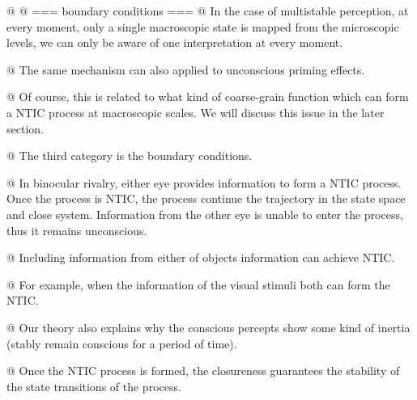 \documentclass[utf8]{article}
\begin{document}
		
		\begin{WritingMaterials}
        	@ 
        	@  === boundary conditions  === 
        	    @ In the case of multistable perception, at every moment, only a single macroscopic state is mapped from the microscopic levels, we can only be aware of one interpretation at every moment. 
        	    
        	    
        	    @ The same mechanism can also applied to unconscious priming effects. 
        	    
        	    @ Of course, this is related to what kind of coarse-grain function which can form a NTIC process at macroscopic scales. We will discuss this issue in the later section.
        	    
        	   
        	   
        	   
        	   @ The third category is the boundary conditions. 
        	   
        	   @ In binocular rivalry, either eye provides information to form a NTIC process. Once the process is NTIC, the process continue the trajectory in the state space and close system. Information from the other eye is unable to enter the process, thus it remains unconscious. 
        	   
        	   @ Including information from either of objects information can achieve NTIC. 
        	   
        	   @ For example, when the information of the visual stimuli both can form the NTIC.
        	   
        	   @ Our theory also explains why the conscious percepts show some kind of inertia (stably remain conscious for a period of time). 
        	   
        	   @ Once the NTIC process is formed, the closureness guarantees the stability of the state transitions of the process. 
                
            \end{WritingMaterials}
        
        


		
\end{document}
